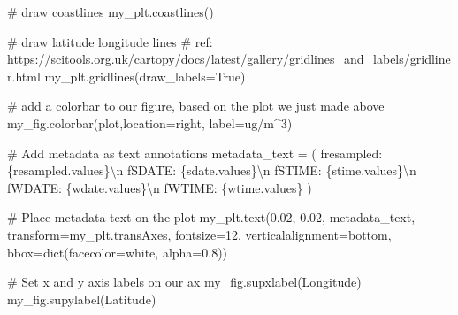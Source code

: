 \documentclass[
  letterpaper,
  DIV=11,
  numbers=noendperiod]{scrreprt}
\newenvironment{Shaded}{\begin{snugshade}}{\end{snugshade}}
\newcommand{\BuiltInTok}[1]{\textcolor[rgb]{0.00,0.23,0.31}{#1}}
\newcommand{\CharTok}[1]{\textcolor[rgb]{0.13,0.47,0.30}{#1}}
\newcommand{\CommentTok}[1]{\textcolor[rgb]{0.37,0.37,0.37}{#1}}
\newcommand{\DecValTok}[1]{\textcolor[rgb]{0.68,0.00,0.00}{#1}}
\newcommand{\FloatTok}[1]{\textcolor[rgb]{0.68,0.00,0.00}{#1}}
\newcommand{\NormalTok}[1]{\textcolor[rgb]{0.00,0.23,0.31}{#1}}
\newcommand{\OperatorTok}[1]{\textcolor[rgb]{0.37,0.37,0.37}{#1}}
\newcommand{\SpecialCharTok}[1]{\textcolor[rgb]{0.37,0.37,0.37}{#1}}
\newcommand{\SpecialStringTok}[1]{\textcolor[rgb]{0.13,0.47,0.30}{#1}}
\newcommand{\StringTok}[1]{\textcolor[rgb]{0.13,0.47,0.30}{#1}}
\newcommand{\VariableTok}[1]{\textcolor[rgb]{0.07,0.07,0.07}{#1}}
\begin{document}
\begin{Shaded}
\begin{Highlighting}[]
\CommentTok{\# draw coastlines}
\NormalTok{my\_plt.coastlines()}

\CommentTok{\# draw latitude longitude lines}
\CommentTok{\# ref: https://scitools.org.uk/cartopy/docs/latest/gallery/gridlines\_and\_labels/gridliner.html}
\NormalTok{my\_plt.gridlines(draw\_labels}\OperatorTok{=}\VariableTok{True}\NormalTok{)}

\CommentTok{\# add a colorbar to our figure, based on the plot we just made above}
\NormalTok{my\_fig.colorbar(plot,location}\OperatorTok{=}\StringTok{\textquotesingle{}right\textquotesingle{}}\NormalTok{, label}\OperatorTok{=}\StringTok{\textquotesingle{}ug/m\^{}3\textquotesingle{}}\NormalTok{)}

\CommentTok{\# Add metadata as text annotations}
\NormalTok{metadata\_text }\OperatorTok{=}\NormalTok{ (}
    \SpecialStringTok{f\textquotesingle{}resampled: }\SpecialCharTok{\{}\NormalTok{resampled}\SpecialCharTok{.}\NormalTok{values}\SpecialCharTok{\}}\CharTok{\textbackslash{}n}\SpecialStringTok{\textquotesingle{}}
    \SpecialStringTok{f\textquotesingle{}SDATE: }\SpecialCharTok{\{}\NormalTok{sdate}\SpecialCharTok{.}\NormalTok{values}\SpecialCharTok{\}}\CharTok{\textbackslash{}n}\SpecialStringTok{\textquotesingle{}}
    \SpecialStringTok{f\textquotesingle{}STIME: }\SpecialCharTok{\{}\NormalTok{stime}\SpecialCharTok{.}\NormalTok{values}\SpecialCharTok{\}}\CharTok{\textbackslash{}n}\SpecialStringTok{\textquotesingle{}}
    \SpecialStringTok{f\textquotesingle{}WDATE: }\SpecialCharTok{\{}\NormalTok{wdate}\SpecialCharTok{.}\NormalTok{values}\SpecialCharTok{\}}\CharTok{\textbackslash{}n}\SpecialStringTok{\textquotesingle{}}
    \SpecialStringTok{f\textquotesingle{}WTIME: }\SpecialCharTok{\{}\NormalTok{wtime}\SpecialCharTok{.}\NormalTok{values}\SpecialCharTok{\}}\SpecialStringTok{\textquotesingle{}}
\NormalTok{)}

\CommentTok{\# Place metadata text on the plot}
\NormalTok{my\_plt.text(}\FloatTok{0.02}\NormalTok{, }\FloatTok{0.02}\NormalTok{, metadata\_text, transform}\OperatorTok{=}\NormalTok{my\_plt.transAxes,}
\NormalTok{            fontsize}\OperatorTok{=}\DecValTok{12}\NormalTok{, verticalalignment}\OperatorTok{=}\StringTok{\textquotesingle{}bottom\textquotesingle{}}\NormalTok{, bbox}\OperatorTok{=}\BuiltInTok{dict}\NormalTok{(facecolor}\OperatorTok{=}\StringTok{\textquotesingle{}white\textquotesingle{}}\NormalTok{, alpha}\OperatorTok{=}\FloatTok{0.8}\NormalTok{))}

\CommentTok{\# Set x and y axis labels on our ax}
\NormalTok{my\_fig.supxlabel(}\StringTok{\textquotesingle{}Longitude\textquotesingle{}}\NormalTok{)}
\NormalTok{my\_fig.supylabel(}\StringTok{\textquotesingle{}Latitude\textquotesingle{}}\NormalTok{)}


\end{Highlighting}
\end{Shaded}
\end{document}
